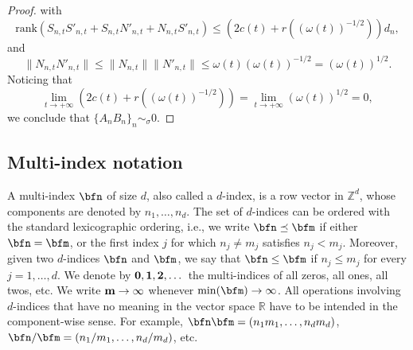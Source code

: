 \documentclass{amsart}
\newcommand{\R}{\mathbb{R}}
\begin{document}
\begin{proof}
    with
    \begin{equation*}
        \mathrm{rank}(S_{n,t}S'_{n,t}+S_{n,t}N'_{n,t} + N_{n,t}S'_{n,t})\leq(2c(t)+r((\omega(t))^{-1/2}))d_n,
    \end{equation*}
    and 
    \begin{equation*}
        \|N_{n,t}N'_{n,t}\|\leq\|N_{n,t}\|\|N'_{n,t}\|\leq \omega(t)(\omega(t))^{-1/2}=(\omega(t))^{1/2}.
    \end{equation*}
    Noticing that
    \begin{equation*}
        \lim\limits_{t\to+\infty} \left(2c(t)+r((\omega(t))^{-1/2})\right)=\lim\limits_{t\to+\infty}(\omega(t))^{1/2}=0,
    \end{equation*}
    we conclude that $\{A_nB_n\}_n\sim_\sigma 0$.
\end{proof}


\subsection{Multi-index notation}

A multi-index $\bfn$ of size $d$, also called a $d$-index, is a row vector in $\mathbb{Z}^d$, whose components are denoted by $n_1,\dots,n_d$. The set of $d$-indices can be ordered with the standard lexicographic ordering, i.e., we write $\bfn \preceq \bfm $ if either $\bfn=\bfm$, or the first index $j$ for which $n_j \neq m_j$ satisfies $n_j < m_j$. Moreover, given two $d$-indices $\bfn$ and $\bfm$, we say that $\bfn \leq \bfm$ if $n_j \leq m_j$ for every $j=1,\dots,d$. We denote by $\bf0,\bf1,\bf2,\dots$ the multi-indices of all zeros, all ones, all twos, etc. We write $\bf m \to \infty$ whenever $\min({\bfm}) \to \infty$. All operations involving $d$-indices that have no meaning in the vector space $\R$ have to be intended in the component-wise sense. For example, $\bfn \bfm = \left( n_1 m_1, \dots, n_d m_d \right)$, $\bfn / \bfm =(n_1/m_1, \dots, n_d/m_d)$, etc.

\end{document}
